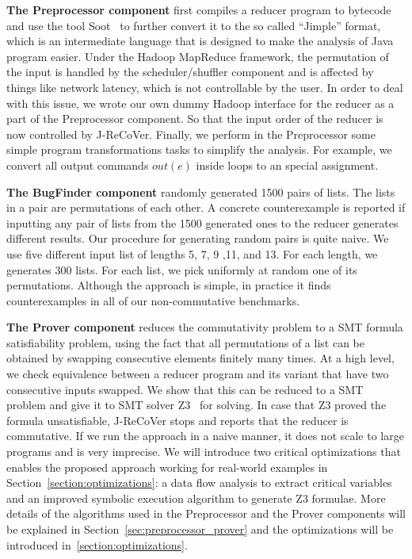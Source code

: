 \documentclass{llncs}
\begin{document}
\textbf{The Preprocessor component} first compiles a reducer program to bytecode and use the tool Soot~\cite{soot} to further convert it to the so called ``Jimple'' format, which is an intermediate language that is designed to make the analysis of Java program easier. Under the Hadoop MapReduce framework, the permutation of the input is handled by the scheduler/shuffler component and is affected by things like network latency, which is not controllable by the user. In order to deal with this issue, we wrote our own dummy Hadoop interface for the reducer as a part of the Preprocessor component. So that the input order of the reducer is now controlled by J-ReCoVer. Finally, we perform in the Preprocessor some simple program transformations tasks to simplify the analysis. For example, we convert all output commands $out(e)$ inside loops to an special assignment.

\textbf{The BugFinder component} randomly generated 1500 pairs of lists. The lists in a pair are permutations of each other. A concrete counterexample is reported if inputting any pair of lists from the 1500 generated ones to the reducer generates different results.
Our procedure for generating random pairs is quite naive. We use five different input list of lengths 5, 7, 9 ,11, and 13. For each length, we generates 300 lists. For each list, we pick uniformly at random one of its permutations. Although the approach is simple, in practice it finds counterexamples in all of our non-commutative benchmarks.

\textbf{The Prover component} reduces the commutativity problem to a SMT formula satisfiability problem, using the fact that all permutations of a list can be obtained by swapping consecutive elements finitely many times. At a high level, we check equivalence between a reducer program and its variant that have two consecutive inputs swapped. We show that this can be reduced to a SMT problem and give it to SMT solver Z3~\cite{z3} for solving. In case that Z3 proved the formula unsatisfiable, J-ReCoVer stops and reports that the reducer is commutative. 
If we run the approach in a naive manner, it does not scale to large programs and is very imprecise.  We will introduce two critical optimizations that enables the proposed approach working for real-world examples in Section~\ref{section:optimizations}: a data flow analysis to extract critical variables and an improved symbolic execution algorithm to generate Z3 formulae. More details of the algorithms used in the Preprocessor and the Prover components will be explained in Section~\ref{sec:preprocessor_prover} and the optimizations will be introduced in~\ref{section:optimizations}. 
\end{document}
